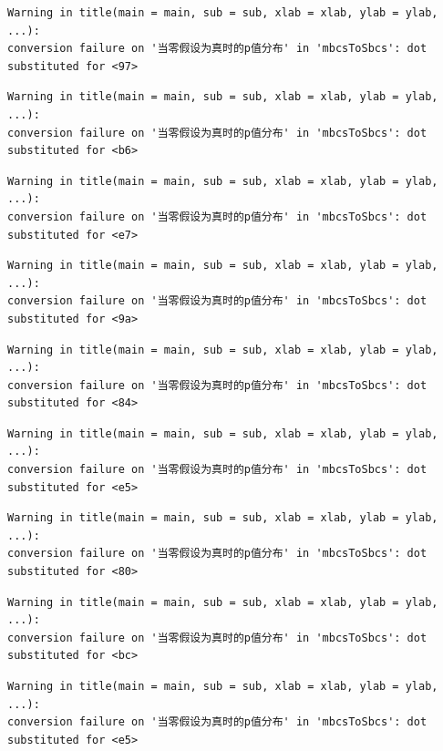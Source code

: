 \documentclass[
  letterpaper,
  DIV=11,
  numbers=noendperiod]{scrreprt}
\begin{document}
\begin{verbatim}
Warning in title(main = main, sub = sub, xlab = xlab, ylab = ylab, ...):
conversion failure on '当零假设为真时的p值分布' in 'mbcsToSbcs': dot
substituted for <97>
\end{verbatim}

\begin{verbatim}
Warning in title(main = main, sub = sub, xlab = xlab, ylab = ylab, ...):
conversion failure on '当零假设为真时的p值分布' in 'mbcsToSbcs': dot
substituted for <b6>
\end{verbatim}

\begin{verbatim}
Warning in title(main = main, sub = sub, xlab = xlab, ylab = ylab, ...):
conversion failure on '当零假设为真时的p值分布' in 'mbcsToSbcs': dot
substituted for <e7>
\end{verbatim}

\begin{verbatim}
Warning in title(main = main, sub = sub, xlab = xlab, ylab = ylab, ...):
conversion failure on '当零假设为真时的p值分布' in 'mbcsToSbcs': dot
substituted for <9a>
\end{verbatim}

\begin{verbatim}
Warning in title(main = main, sub = sub, xlab = xlab, ylab = ylab, ...):
conversion failure on '当零假设为真时的p值分布' in 'mbcsToSbcs': dot
substituted for <84>
\end{verbatim}

\begin{verbatim}
Warning in title(main = main, sub = sub, xlab = xlab, ylab = ylab, ...):
conversion failure on '当零假设为真时的p值分布' in 'mbcsToSbcs': dot
substituted for <e5>
\end{verbatim}

\begin{verbatim}
Warning in title(main = main, sub = sub, xlab = xlab, ylab = ylab, ...):
conversion failure on '当零假设为真时的p值分布' in 'mbcsToSbcs': dot
substituted for <80>
\end{verbatim}

\begin{verbatim}
Warning in title(main = main, sub = sub, xlab = xlab, ylab = ylab, ...):
conversion failure on '当零假设为真时的p值分布' in 'mbcsToSbcs': dot
substituted for <bc>
\end{verbatim}

\begin{verbatim}
Warning in title(main = main, sub = sub, xlab = xlab, ylab = ylab, ...):
conversion failure on '当零假设为真时的p值分布' in 'mbcsToSbcs': dot
substituted for <e5>
\end{verbatim}
\end{document}
